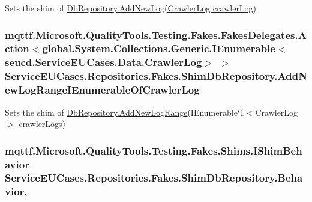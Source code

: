 Sets the shim of \hyperlink{class_service_e_u_cases_1_1_repositories_1_1_db_repository_a99421faf8de77dc789effe40a7b93113}{Db\-Repository.\-Add\-New\-Log(\-Crawler\-Log crawler\-Log)}

\hypertarget{class_service_e_u_cases_1_1_repositories_1_1_fakes_1_1_shim_db_repository_ade66b2a325a5ba4e5556a978ca31118a}{
\subsubsection[{Add\-New\-Log\-Range\-I\-Enumerable\-Of\-Crawler\-Log}]{\setlength{\rightskip}{0pt plus 5cm}mqttf.\-Microsoft.\-Quality\-Tools.\-Testing.\-Fakes.\-Fakes\-Delegates.\-Action$<$global.\-System.\-Collections.\-Generic.\-I\-Enumerable$<$seucd.\-Service\-E\-U\-Cases.\-Data.\-Crawler\-Log$>$ $>$ Service\-E\-U\-Cases.\-Repositories.\-Fakes.\-Shim\-Db\-Repository.\-Add\-New\-Log\-Range\-I\-Enumerable\-Of\-Crawler\-Log\hspace{0.3cm}{\ttfamily [set]}}}\label{class_service_e_u_cases_1_1_repositories_1_1_fakes_1_1_shim_db_repository_ade66b2a325a5ba4e5556a978ca31118a}


Sets the shim of \hyperlink{class_service_e_u_cases_1_1_repositories_1_1_db_repository_a9af7cfcd5421e7ffb403430487138ae5}{Db\-Repository.\-Add\-New\-Log\-Range}(I\-Enumerable`1$<$Crawler\-Log$>$ crawler\-Logs)

\hypertarget{class_service_e_u_cases_1_1_repositories_1_1_fakes_1_1_shim_db_repository_afa8a87c3168d120e79b4a89d36382e71}{
\subsubsection[{Behavior}]{\setlength{\rightskip}{0pt plus 5cm}mqttf.\-Microsoft.\-Quality\-Tools.\-Testing.\-Fakes.\-Shims.\-I\-Shim\-Behavior Service\-E\-U\-Cases.\-Repositories.\-Fakes.\-Shim\-Db\-Repository.\-Behavior\hspace{0.3cm}{\ttfamily [static]}, {\ttfamily [set]}}}\label{class_service_e_u_cases_1_1_repositories_1_1_fakes_1_1_shim_db_repository_afa8a87c3168d120e79b4a89d36382e71}


